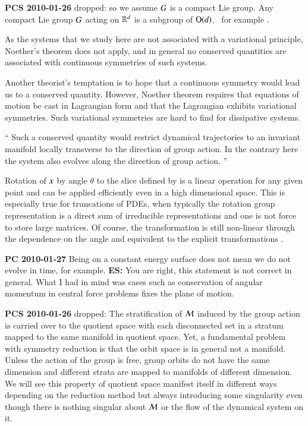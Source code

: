 {\bf PCS 2010-01-26} dropped:
    so we assume $G$ is a compact Lie group.
    Any compact Lie group $G$ acting on $\mathbb{R}^{d}$ is
    a subgroup of $\textrm{O}(d)$, \cf\ for example .



As the systems that we study here are not associated with a
variational principle, Noether's theorem does not
apply, and in general no conserved
quantities are associated with continuous symmetries of
such systems.

Another theorist's temptation is to hope that a continuous
symmetry would lead us to a conserved quantity. However,
Noether theorem requires that equations of motion be cast in
Lagrangian form and that the Lagrangian exhibits variational
symmetries. Such variational
symmetries are hard to find for dissipative systems.


``
Such a conserved quantity would restrict dynamical
trajectories to an invariant manifold locally transverse to
the direction of group action. In the contrary here the
system also evolves along the direction of group action.
    ''

Rotation of $x$ by angle $\theta$
to the slice defined by  is a linear operation
for any given point and can be applied efficiently
even in a high dimensional space. This is especially true
for truncations of PDEs, when typically the rotation group
representation is a direct sum of irreducible
representations and one is not force to store large matrices.
Of course, the transformation is still non-linear
through the dependence on the angle and equivalent to the
explicit transformations .

{\bf PC 2010-01-27}
Being on a constant energy surface does not mean we do
not evolve in time, for example.
{\bf ES:} You are right, this statement is not correct in
general. What I had in mind was cases such as
conservation of angular momentum in central force 		
problems fixes the plane of motion.

{\bf PCS 2010-01-26} dropped:
The stratification
of ${\cal M}$ induced by the group action is carried over to
the quotient space with each disconnected set in a stratum
mapped to the same manifold in quotient space. Yet, a
fundamental problem with symmetry reduction is that the orbit
space is in general not a manifold. Unless the action of the
group is free, group orbits do not have the same dimension
and different strata are mapped to manifolds of different
dimension. We will see this property of quotient space
manifest itself in different ways depending on the reduction
method but always introducing some singularity even though
there is nothing singular about ${\cal M}$ or the flow of the
dynamical system on it.



